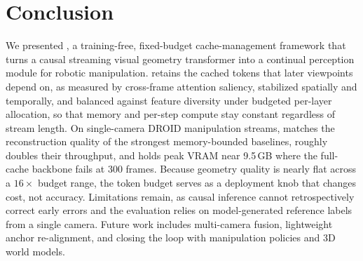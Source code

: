 \section{Conclusion}
\label{sec:conclusion}

We presented \method{}, a training-free, fixed-budget cache-management framework that turns a causal streaming visual geometry transformer into a continual perception module for robotic manipulation. \method{} retains the cached tokens that later viewpoints depend on, as measured by cross-frame attention saliency, stabilized spatially and temporally, and balanced against feature diversity under budgeted per-layer allocation, so that memory and per-step compute stay constant regardless of stream length. On single-camera DROID manipulation streams, \method{} matches the reconstruction quality of the strongest memory-bounded baselines, roughly doubles their throughput, and holds peak VRAM near 9.5\,GB where the full-cache backbone fails at 300 frames. Because geometry quality is nearly flat across a $16\times$ budget range, the token budget serves as a deployment knob that changes cost, not accuracy. Limitations remain, as causal inference cannot retrospectively correct early errors and the evaluation relies on model-generated reference labels from a single camera. Future work includes multi-camera fusion, lightweight anchor re-alignment, and closing the loop with manipulation policies and 3D world models.
